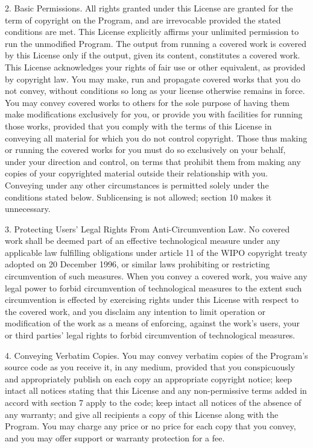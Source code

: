 \documentclass {book}
\begin{document}
\begin{tiny}
2. Basic Permissions. All rights granted under this License are granted for the term of copyright on the Program, and are irrevocable provided the stated conditions are met. This License explicitly affirms your unlimited permission to run the unmodified Program. The output from running a covered work is covered by this License only if the output, given its content, constitutes a covered work. This License acknowledges your rights of fair use or other equivalent, as provided by copyright law. You may make, run and propagate covered works that you do not convey, without conditions so long as your license otherwise remains in force. You may convey covered works to others for the sole purpose of having them make modifications exclusively for you, or provide you with facilities for running those works, provided that you comply with the terms of this License in conveying all material for which you do not control copyright. Those thus making or running the covered works for you must do so exclusively on your behalf, under your direction and control, on terms that prohibit them from making any copies of your copyrighted material outside their relationship with you. Conveying under any other circumstances is permitted solely under the conditions stated below. Sublicensing is not allowed; section 10 makes it unnecessary.

3. Protecting Users' Legal Rights From Anti-Circumvention Law. No covered work shall be deemed part of an effective technological measure under any applicable law fulfilling obligations under article 11 of the WIPO copyright treaty adopted on 20 December 1996, or similar laws prohibiting or restricting circumvention of such measures. When you convey a covered work, you waive any legal power to forbid circumvention of technological measures to the extent such circumvention is effected by exercising rights under this License with respect to the covered work, and you disclaim any intention to limit operation or modification of the work as a means of enforcing, against the work's users, your or third parties' legal rights to forbid circumvention of technological measures.

4. Conveying Verbatim Copies. You may convey verbatim copies of the Program's source code as you receive it, in any medium, provided that you conspicuously and appropriately publish on each copy an appropriate copyright notice; keep intact all notices stating that this License and any non-permissive terms added in accord with section 7 apply to the code; keep intact all notices of the absence of any warranty; and give all recipients a copy of this License along with the Program. You may charge any price or no price for each copy that you convey, and you may offer support or warranty protection for a fee.


\end{tiny}
\end{document}
